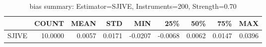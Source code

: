 \begin{table}[ht]
\centering
\caption{bias summary: Estimator=SJIVE, Instruments=200, Strength=0.70}
\begin{tabular}{lrrrrrrrr}
\toprule
 & COUNT & MEAN & STD & MIN & 25\% & 50\% & 75\% & MAX \\
\midrule
SJIVE & 10.0000 & 0.0057 & 0.0171 & -0.0207 & -0.0068 & 0.0062 & 0.0147 & 0.0396 \\
\bottomrule
\end{tabular}
\end{table}
